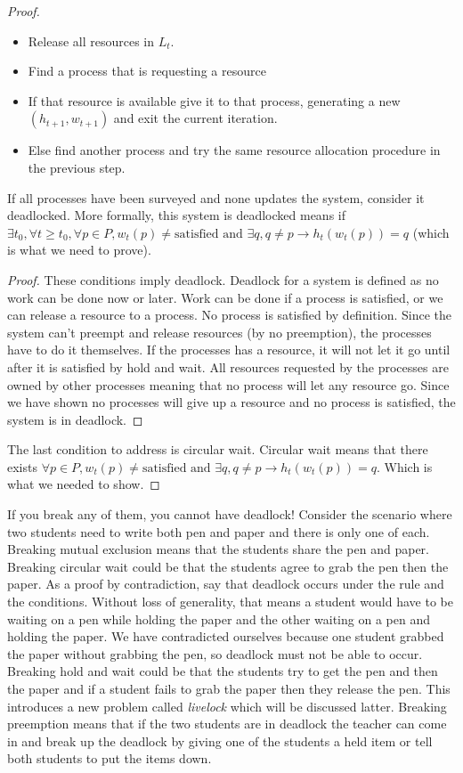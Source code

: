 \begin{proof}
\begin{itemize}
\item Release all resources in $L_t$.
\item Find a process that is requesting a resource
\item If that resource is available give it to that process, generating a new $(h_{t+1}, w_{t+1})$ and exit the current iteration.
\item Else find another process and try the same resource allocation procedure in the previous step.
\end{itemize}

If all processes have been surveyed and none updates the system, consider it deadlocked.
More formally, this system is deadlocked means  if $\exists t_0, \forall t \geq t_0, \forall p \in P, w_t(p) \neq \text{satisfied} \text{ and } \exists q, q \neq p \rightarrow h_t(w_t(p)) = q$ (which is what we need to prove).

\begin{proof} These conditions imply deadlock.
  Deadlock for a system is defined as no work can be done now or later.
  Work can be done if a process is satisfied, or we can release a resource to a process.
  No process is satisfied by definition.
  Since the system can't preempt and release resources (by no preemption), the processes have to do it themselves.
  If the processes has a resource, it will not let it go until after it is satisfied by hold and wait.
  All resources requested by the processes are owned by other processes meaning that no process will let any resource go.
  Since we have shown no processes will give up a resource and no process is satisfied, the system is in deadlock.
\end{proof}
The last condition to address is circular wait.
Circular wait means that there exists $\forall p \in P, w_t(p) \neq \text{satisfied} \text{ and } \exists q, q \neq p \rightarrow h_t(w_t(p)) = q$.
Which is what we needed to show.
\end{proof}

If you break any of them, you cannot have deadlock!
Consider the scenario where two students need to write both pen and paper and there is only one of each.
Breaking mutual exclusion means that the students share the pen and paper.
Breaking circular wait could be that the students agree to grab the pen then the paper.
As a proof by contradiction, say that deadlock occurs under the rule and the conditions.
Without loss of generality, that means a student would have to be waiting on a pen while holding the paper and the other waiting on a pen and holding the paper.
We have contradicted ourselves because one student grabbed the paper without grabbing the pen, so deadlock must not be able to occur.
Breaking hold and wait could be that the students try to get the pen and then the paper and if a student fails to grab the paper then they release the pen.
This introduces a new problem called \textit{livelock} which will be discussed latter.
Breaking preemption means that if the two students are in deadlock the teacher can come in and break up the deadlock by giving one of the students a held item or tell both students to put the items down.


